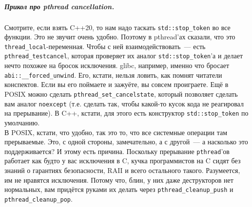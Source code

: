 \documentclass{article}
\begin{document}
    \subparagraph{Прикол про pthread cancellation.}
    Смотрите, если взять C++20, то нам надо таскать \texttt{std::stop_token} во все функции. Это не звучит очень удобно. Поэтому в pthread'ах сказали, что это \texttt{thread_local}-переменная. Чтобы с ней взаимодействовать~--- есть \texttt{pthread_testcancel}, которая проверяет их аналог \texttt{std::stop_token}'а и делает нечто похожее на бросок исключения. glibc, например, именно что бросает \texttt{abi::__forced_unwind}. Его, кстати, нельзя ловить, как помнят читатели конспектов. Если вы его поймаете и зажуёте, вы совсем проиграете. Ещё в POSIX можно сделать \texttt{pthread_set_cancelstate}, который позволяет сделать вам аналог \texttt{noexcept} (т.е. сделать так, чтобы какой-то кусок кода не реагировал на прерывание). В C++, кстати, для этого есть конструктор \texttt{std::stop_token} по умолчанию.\\
    В POSIX, кстати, что удобно, так это то, что все системные операции там прерываемые. Это, с одной стороны, замечательно, а с другой~--- а насколько это поддерживается? И этому есть причина. Поскольку прерывание \texttt{pthread}'ов работает как будто у вас исключения в C, кучка программистов на C сидят без знаний о гарантиях безопасности, RAII и всего остального такого. Разумеется, им не нравятся исключения. Потому что, блин, у них даже деструкторов нет нормальных, вам придётся руками их делать через \texttt{pthread_cleanup_push} и \texttt{pthread_cleanup_pop}.
\end{document}
